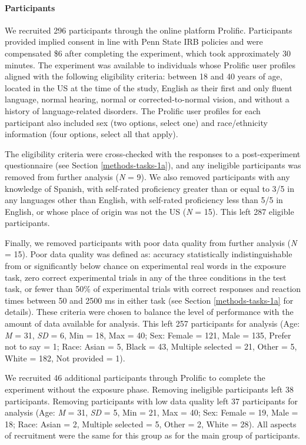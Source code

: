\documentclass[
  12pt,
  twoside]{article}
\begin{document}
\hypertarget{methods-pars-1a}{%
\paragraph{Participants}\label{methods-pars-1a}}

We recruited 296 participants through the online platform Prolific.
Participants provided implied consent in line with Penn State IRB policies and were compensated \$6 after completing the experiment, which took approximately 30 minutes.
The experiment was available to individuals whose Prolific user profiles aligned with the following eligibility criteria: between 18 and 40 years of age, located in the US at the time of the study, English as their first and only fluent language, normal hearing, normal or corrected-to-normal vision, and without a history of language-related disorders.
The Prolific user profiles for each participant also included sex (two options, select one) and race/ethnicity information (four options, select all that apply).

The eligibility criteria were cross-checked with the responses to a post-experiment questionnaire (see Section \ref{methods-tasks-1a}), and any ineligible participants was removed from further analysis (\emph{N} = 9).
We also removed participants with any knowledge of Spanish, with self-rated proficiency greater than or equal to 3/5 in any languages other than English, with self-rated proficiency less than 5/5 in English, or whose place of origin was not the US (\emph{N} = 15).
This left 287 eligible participants.

Finally, we removed participants with poor data quality from further analysis (\emph{N} = 15).
Poor data quality was defined as: accuracy statistically indistinguishable from or significantly below chance on experimental real words in the exposure task, zero correct experimental trials in any of the three conditions in the test task, or fewer than 50\% of experimental trials with correct responses and reaction times between 50 and 2500 ms in either task (see Section \ref{methods-tasks-1a} for details).
These criteria were chosen to balance the level of performance with the amount of data available for analysis.
This left 257 participants for analysis (Age: \emph{M} = 31, \emph{SD} = 6, Min = 18, Max = 40; Sex: Female = 121, Male = 135, Prefer not to say = 1; Race: Asian = 5, Black = 43, Multiple selected = 21, Other = 5, White = 182, Not provided = 1).

We recruited 46 additional participants through Prolific to complete the experiment without the exposure phase.
Removing ineligible participants left 38 participants.
Removing participants with low data quality left 37 participants for analysis (Age: \emph{M} = 31, \emph{SD} = 5, Min = 21, Max = 40; Sex: Female = 19, Male = 18; Race: Asian = 2, Multiple selected = 5, Other = 2, White = 28).
All aspects of recruitment were the same for this group as for the main group of participants.
\end{document}
